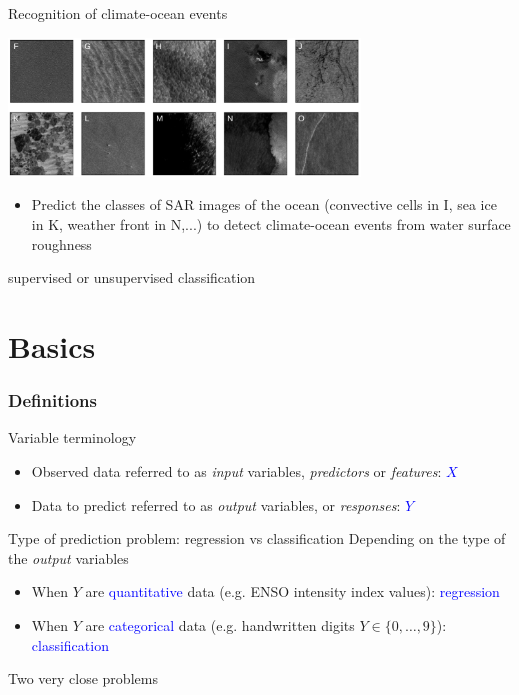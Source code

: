 \documentclass[pressentation,9pt,aspectratio=1610,xcolor=table]{beamer}
\newcommand{\structuretext}[1]{{\textcolor{blue}{#1}}}
\newcommand{\doigt}{\noindent \Pisymbol{pzd}{43}}
\begin{document}
\begin{frame}{Recognition of climate-ocean events}

  \begin{center}
    \includegraphics[keepaspectratio=true,width=0.7\textwidth]{SAR_classes.png}
  \end{center}
  \begin{itemize}
  \item[\doigt] Predict the classes of SAR images  of the ocean (convective cells in I, sea ice in K, weather front in N,...) to detect
    climate-ocean events from water surface roughness 
  \end{itemize}
  
  \begin{center}
    \alert{supervised or unsupervised classification}
  \end{center}
  
\end{frame}


\section{Basics}
\begin{frame}
  \frametitle{Definitions}
  \begin{block}{Variable terminology}
    \begin{itemize}
    \item Observed data referred to as {\em input} variables, {\em predictors} or {\em features}: \textcolor{blue}{$X$}
    \item Data to predict referred to as {\em output} variables, or {\em responses}: \textcolor{blue}{$Y$}
    \end{itemize}
  \end{block}
  
  \begin{block}{Type of prediction problem: regression vs classification}
    Depending on the type of the {\em output} variables
    \begin{itemize}
    \item When $Y$ are \structuretext{quantitative} data (e.g. ENSO intensity index values): \structuretext{regression}
    \item When $Y$ are \structuretext{categorical} data (e.g. handwritten digits $Y\in \{0,\ldots,9\}$): \structuretext{classification}
    \end{itemize}\medskip
    
    Two very close problems
  \end{block}
\end{frame}
\end{document}
